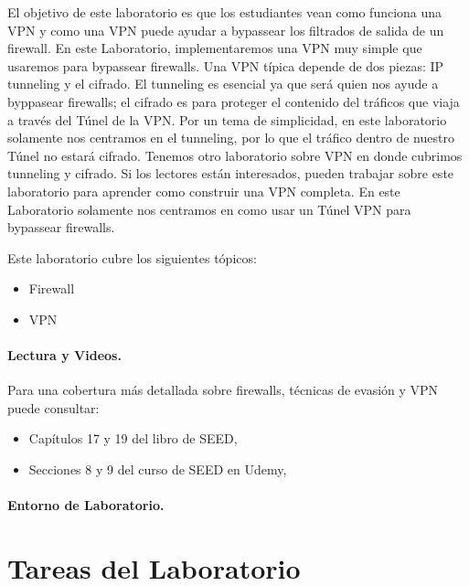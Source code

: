El objetivo de este laboratorio es que los estudiantes vean como funciona una VPN y como una VPN puede ayudar a bypassear los filtrados de salida de un firewall.
En este Laboratorio, implementaremos una VPN muy simple que usaremos para bypassear firewalls. Una VPN típica depende de dos piezas: IP tunneling y el cifrado. El tunneling es esencial ya que será quien nos ayude a byppasear firewalls; el cifrado es para proteger el contenido del tráficos que viaja a través del Túnel de la VPN.
Por un tema de simplicidad, en este laboratorio solamente nos centramos en el tunneling, por lo que el tráfico dentro de nuestro Túnel no estará cifrado. Tenemos otro laboratorio sobre VPN en donde cubrimos tunneling y cifrado. Si los lectores están interesados, pueden trabajar sobre este laboratorio para aprender como construir una VPN completa. En este Laboratorio solamente nos centramos en como usar un Túnel VPN para bypassear firewalls.

Este laboratorio cubre los siguientes tópicos:

\begin{itemize}[noitemsep]
\item Firewall
\item VPN
\end{itemize}


\paragraph{Lectura y Videos.}
Para una cobertura más detallada sobre firewalls, técnicas de evasión y VPN puede consultar:

\begin{itemize}
\item Capítulos 17 y 19 del libro de SEED, \seedbook
\item Secciones 8 y 9 del curso de SEED en Udemy, \seedisvideo
\end{itemize}


\paragraph{Entorno de Laboratorio.} \seedenvironmentB
 


\section{Tareas del Laboratorio}




